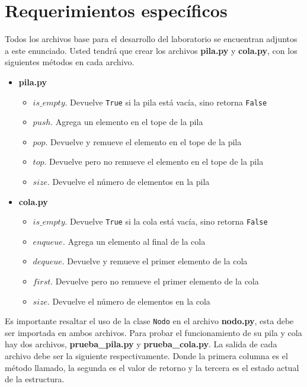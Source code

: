 \documentclass[11pt, letterpaper]{article}
\begin{document}
\section*{Requerimientos específicos}
Todos los archivos base para el desarrollo del laboratorio se encuentran adjuntos a este enunciado. Usted tendrá que crear los archivos \textbf{pila.py} y \textbf{cola.py}, con los siguientes métodos en cada archivo.

\newpage

\begin{itemize}
    \item \textbf{pila.py}
        \begin{itemize}
            \item{$is\_empty$. Devuelve \texttt{True} si la pila está vacía, sino retorna \texttt{False}}
            \item{$push$. Agrega un elemento en el tope de la pila}
            \item{$pop$. Devuelve y remueve el elemento en el tope de la pila}
            \item{$top$. Devuelve pero no remueve el elemento en el tope de la pila}
            \item{$size$. Devuelve el número de elementos en la pila}
        \end{itemize}
    \item \textbf{cola.py}
        \begin{itemize}
            \item{$is\_empty$. Devuelve \texttt{True} si la cola está vacía, sino retorna \texttt{False}}
            \item{$enqueue$. Agrega un elemento al final de la cola}
            \item{$dequeue$. Devuelve y remueve el primer elemento de la cola}
            \item{$first$. Devuelve pero no remueve el primer elemento de la cola}
            \item{$size$. Devuelve el número de elementos en la cola}
        \end{itemize}
\end{itemize}

Es importante resaltar el uso de la clase \texttt{Nodo} en el archivo \textbf{nodo.py}, esta debe ser importada en ambos archivos. Para probar el funcionamiento de su pila y cola hay dos archivos, \textbf{prueba\_pila.py} y \textbf{prueba\_cola.py}. La salida de cada archivo debe ser la siguiente respectivamente. Donde la primera columna es el método llamado, la segunda es el valor de retorno y la tercera es el estado actual de la estructura.
\end{document}
